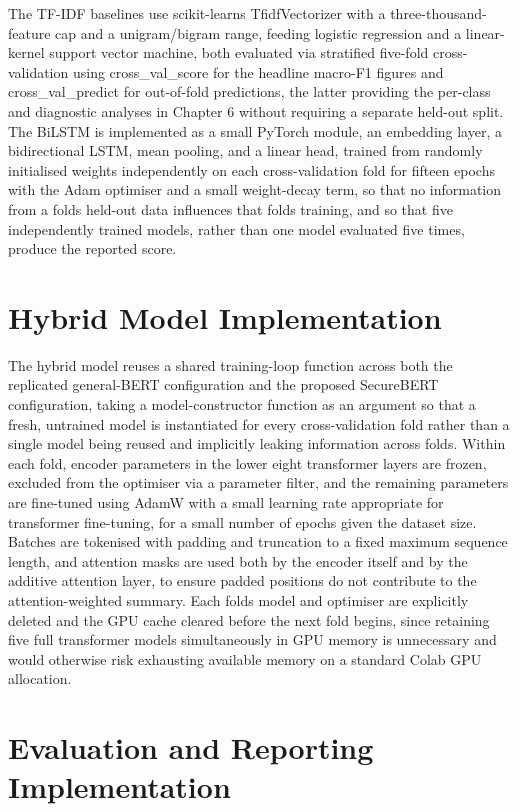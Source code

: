 \documentclass[12pt,a4paper]{report}
\begin{document}
The TF-IDF baselines use scikit-learn\textquotesingle s TfidfVectorizer
with a three-thousand-feature cap and a unigram/bigram range, feeding
logistic regression and a linear-kernel support vector machine, both
evaluated via stratified five-fold cross-validation using
cross\_val\_score for the headline macro-F1 figures and
cross\_val\_predict for out-of-fold predictions, the latter providing
the per-class and diagnostic analyses in Chapter 6 without requiring a
separate held-out split. The BiLSTM is implemented as a small PyTorch
module, an embedding layer, a bidirectional LSTM, mean pooling, and a
linear head, trained from randomly initialised weights independently on
each cross-validation fold for fifteen epochs with the Adam optimiser
and a small weight-decay term, so that no information from a
fold\textquotesingle s held-out data influences that
fold\textquotesingle s training, and so that five independently trained
models, rather than one model evaluated five times, produce the reported
score.
\section{Hybrid Model
Implementation}\label{hybrid-model-implementation}

The hybrid model reuses a shared training-loop function across both the
replicated general-BERT configuration and the proposed SecureBERT
configuration, taking a model-constructor function as an argument so
that a fresh, untrained model is instantiated for every cross-validation
fold rather than a single model being reused and implicitly leaking
information across folds. Within each fold, encoder parameters in the
lower eight transformer layers are frozen, excluded from the optimiser
via a parameter filter, and the remaining parameters are fine-tuned
using AdamW with a small learning rate appropriate for transformer
fine-tuning, for a small number of epochs given the dataset size.
Batches are tokenised with padding and truncation to a fixed maximum
sequence length, and attention masks are used both by the encoder itself
and by the additive attention layer, to ensure padded positions do not
contribute to the attention-weighted summary. Each
fold\textquotesingle s model and optimiser are explicitly deleted and
the GPU cache cleared before the next fold begins, since retaining five
full transformer models simultaneously in GPU memory is unnecessary and
would otherwise risk exhausting available memory on a standard Colab GPU
allocation.
\section{Evaluation and Reporting
Implementation}\label{evaluation-and-reporting-implementation}
\end{document}
